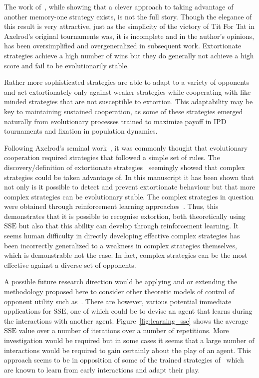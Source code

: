 \documentclass[a4paper]{article}
\newcommand{\SSe}{\text{SSE}}
\begin{document}
The work of~\cite{Press2012}, while showing that a clever approach to taking
advantage of another memory-one strategy exists, is not the full story.
Though the elegance of this result is very attractive, just as the simplicity of
the victory of Tit For Tat in Axelrod's original tournaments was, it is
incomplete and in the author's opinions, has been oversimplified and
overgeneralized in subsequent work. Extortionate strategies achieve a high
number of wins but they do generally not achieve a high score and fail to be
evolutionarily stable.

Rather more sophisticated strategies are able to adapt to a variety of opponents
and act extortionately only against weaker strategies while cooperating with
like-minded strategies that are not susceptible to extortion. This adaptability
may be key to maintaining sustained cooperation, as some of these strategies
emerged naturally from evolutionary processes trained to maximize payoff in
IPD tournaments and fixation in population dynamics.

Following Axelrod's seminal work~\cite{Axelrod1980, Axelrod1980a}, it was
commonly thought that evolutionary cooperation required strategies that followed
a simple set of rules. The discovery/definition of extortionate
strategies~\cite{Press2012} seemingly showed that complex strategies could be
taken advantage of. In this manuscript it has been shown that not only is it
possible to detect and prevent extortionate behaviour but that more complex
strategies can be evolutionary stable. The complex strategies in question were
obtained through reinforcement learning approaches~\cite{Harper2017, Moran1707}.
Thus, this demonstrates that it is possible to recognise extortion, both
theoretically using \(\SSe\) but also that this ability can develop through
reinforcement learning. It seems human difficulty in directly developing
effective complex strategies has been incorrectly generalized to a weakness
in complex strategies themselves, which is demonstrable not the case. In fact,
complex strategies can be the most effective against a diverse set of opponents.


A possible future research direction would be applying and or extending the
methodology proposed here to consider other theoretic models of control of
opponent utility such as~\cite{Akin2015, hao2018, chen2022}. There are however,
various potential immediate applications for \(\SSe\), one of which could be to
devise an agent that learns during the interactions with another agent.
Figure~\ref{fig:learning_sse} shows the average \(\SSe\) value over a number of
iterations over a number of repetitions. More investigation would be required
but in some cases it seems that a large number of interactions would be required
to gain certainly about the play of an agent. This approach seems to be in
opposition of some of the trained strategies of~\cite{Harper2017} which are
known to learn from early interactions and adapt their play.
\end{document}
